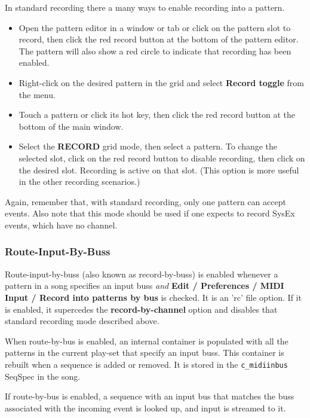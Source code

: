    In standard recording there a many ways to enable recording into
   a pattern.

   \begin{itemize}
      \item Open the pattern editor in a window or tab or click on the
         pattern slot to record, then click the red record
         button at the bottom of the pattern editor.
         The pattern will also
         show a red circle to indicate that recording has been enabled.
      \item Right-click on the desired pattern in the grid and select
         \textbf{Record toggle} from the menu.
      \item Touch a pattern or click its hot key, then
         click the red record button at the bottom of the main window.
      \item Select the \textbf{RECORD} grid mode, then select a pattern.
         To change the selected slot, click on the red record button
         to disable recording, then click on the desired slot.
         Recording is active on that slot.
         (This option is more useful in the other recording scenarios.)
   \end{itemize}

   Again, remember that, with standard recording, only one pattern can
   accept events.
   Also note that this mode should be used if one
   expects to record SysEx events, which have no channel.

\subsubsection{Route-Input-By-Buss}
\label{subsubsec:recording_route_by_buss}

   Route-input-by-buss (also known as record-by-buss)
   is enabled whenever a pattern in a song specifies an
   input buss \textsl{and}
   \textbf{Edit / Preferences / MIDI Input / Record into patterns by
   bus} is checked. It is an 'rc' file option.
   If it is enabled, it supercedes the
   \textbf{record-by-channel} option and
   disables that standard recording mode described above.

   When route-by-bus is enabled, an internal container is populated with
   all the patterns in the current play-set that specify an input buss.
   This container is rebuilt when a sequence is added or removed.
   It is stored in the \texttt{c\_midiinbus} SeqSpec in the song.

   If route-by-bus is enabled, a sequence with an input bus that matches the
   buss associated with the incoming event is looked up, and input is
   streamed to it.


